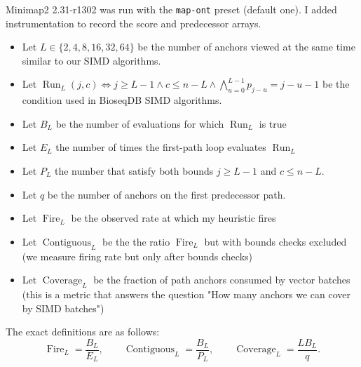 Minimap2 2.31-r1302 was run with the \texttt{map-ont} preset (default one). 
I added instrumentation to record the score and predecessor arrays.
\begin{itemize}
    \item Let $L\in\{2,4,8,16,32,64\}$ be the number of anchors viewed at the same time similar to our SIMD algorithms. 
    \item Let $\operatorname{Run}_L(j,c) \iff j\geq L-1 \land c\leq n-L \land \bigwedge_{u=0}^{L-1}p_{j-u}=j-u-1$ be the condition used in BioseqDB SIMD algorithms.
    \item Let \(B_L\) be the number of evaluations for which \(\operatorname{Run}_L\) is true
    \item Let \(E_L\) the number of times the first-path loop evaluates \(\operatorname{Run}_L\)
    \item Let \(P_L\) the number that satisfy both bounds \(j\geq L-1\) and \(c\leq n-L\).
    \item Let $q$ be the number of anchors on the first predecessor path.
    \item Let $\operatorname{Fire}_L$ be the observed rate at which my heuristic fires
    \item Let $\operatorname{Contiguous}_L$ be the the ratio $\operatorname{Fire}_L$ but with bounds checks excluded (we measure firing rate but only after bounds checks)
    \item Let $\operatorname{Coverage}_L$ be the fraction of path anchors consumed by vector batches (this is a metric that answers the question "How many anchors we can cover by SIMD batches")
\end{itemize}

The exact definitions are as follows:
\[
  \operatorname{Fire}_L=\frac{B_L}{E_L},
  \qquad
  \operatorname{Contiguous}_L=\frac{B_L}{P_L},
  \qquad
  \operatorname{Coverage}_L=\frac{LB_L}{q}.
\]




